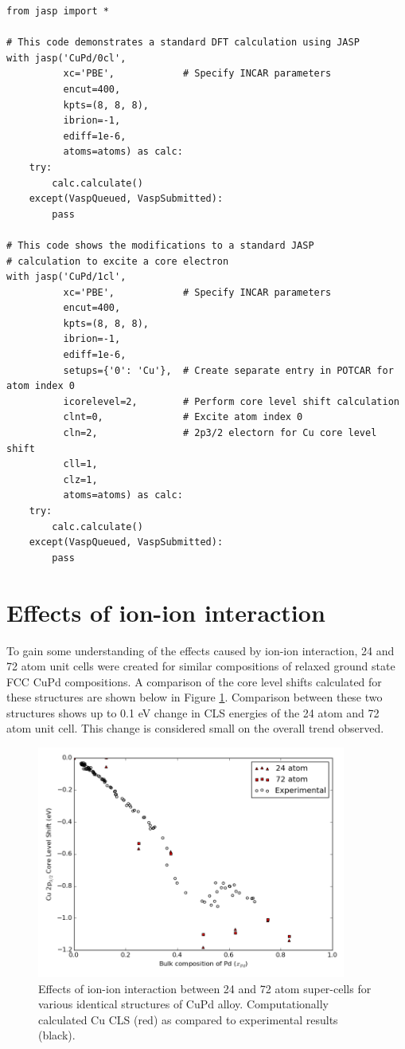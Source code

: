 \documentclass[number, sort&compress, review, 12pt]{elsarticle}
\begin{document}
\begin{verbatim}
from jasp import *

# This code demonstrates a standard DFT calculation using JASP
with jasp('CuPd/0cl',
          xc='PBE',            # Specify INCAR parameters
          encut=400,
          kpts=(8, 8, 8),
          ibrion=-1,
          ediff=1e-6,
          atoms=atoms) as calc:
    try:
        calc.calculate()
    except(VaspQueued, VaspSubmitted):
        pass

# This code shows the modifications to a standard JASP
# calculation to excite a core electron
with jasp('CuPd/1cl',
          xc='PBE',            # Specify INCAR parameters
          encut=400,
          kpts=(8, 8, 8),
          ibrion=-1,
          ediff=1e-6,
          setups={'0': 'Cu'},  # Create separate entry in POTCAR for atom index 0
          icorelevel=2,        # Perform core level shift calculation
          clnt=0,              # Excite atom index 0
          cln=2,               # 2p3/2 electorn for Cu core level shift
          cll=1,
          clz=1,
          atoms=atoms) as calc:
    try:
        calc.calculate()
    except(VaspQueued, VaspSubmitted):
        pass
\end{verbatim}

\section{Effects of ion-ion interaction}
\label{sec-5}
To gain some understanding of the effects caused by ion-ion interaction, 24 and 72 atom unit cells were created for similar compositions of relaxed ground state FCC CuPd compositions. A comparison of the core level shifts calculated for these structures are shown below in Figure \ref{fig-ion}. Comparison between these two structures shows up to 0.1 eV change in CLS energies of the 24 atom and 72 atom unit cell. This change is considered small on the overall trend observed.

\begin{figure}[H]
\centering
\includegraphics[width=4in]{./images/ion-int.png}
\caption{\label{fig-ion}Effects of ion-ion interaction between 24 and 72 atom super-cells for various identical structures of CuPd alloy. Computationally calculated Cu CLS (red) as compared to experimental results (black).}
\end{figure}
\end{document}
